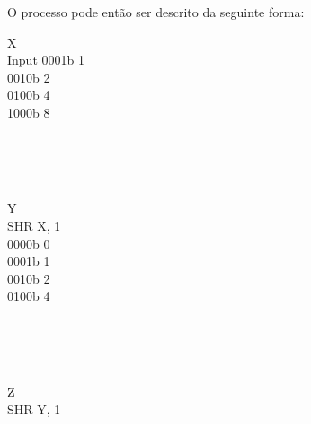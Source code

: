 \documentclass{article}
\begin{document}
\bigbreak
O processo pode então ser descrito da seguinte forma:
\begin{center}
    \begin{minipage}{1.5cm}
        \begin{center}
            X \\
            Input
            0001b 1 \\
            0010b 2 \\
            0100b 4 \\
            1000b 8
        \end{center}
    \end{minipage}
    \begin{minipage}{0.5cm}
        \begin{center}
            \vspace{1.1cm}
            \textrightarrow \\
            \textrightarrow \\
            \textrightarrow \\
            \textrightarrow
        \end{center}
    \end{minipage}
    \begin{minipage}{1.5cm}
        \begin{center}
            Y \\
            SHR X, 1 \\
            0000b 0 \\
            0001b 1 \\
            0010b 2 \\
            0100b 4
        \end{center}
    \end{minipage}
    \begin{minipage}{0.5cm}
        \begin{center}
            \vspace{1.1cm}
            \textrightarrow \\
            \textrightarrow \\
            \textrightarrow \\
            \textrightarrow
        \end{center}
    \end{minipage}
    \begin{minipage}{1.5cm}
        \begin{center}
            Z \\
            SHR Y, 1 \\

\end{center}
\end{minipage}
\end{center}
\end{document}
